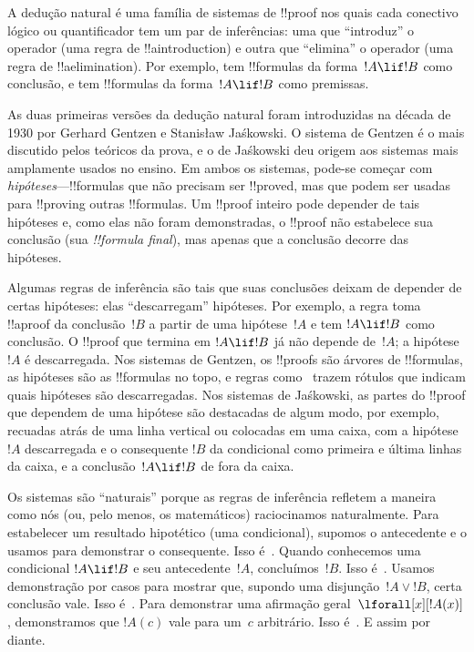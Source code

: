 \documentclass[../../../include/open-logic-section]{subfiles}
\begin{document}


A dedução natural é uma família de sistemas de !!{proof} nos quais cada
conectivo lógico ou quantificador tem um par de inferências: uma que
``introduz'' o operador (uma regra de !!a{introduction}) e outra que
``elimina'' o operador (uma regra de !!a{elimination}). Por exemplo,
\Intro{\lif} tem !!{formula}s da forma~$!A \lif !B$ como conclusão, e
\Elim{\lif} tem !!{formula}s da forma~$!A \lif !B$ como premissas.

As duas primeiras versões da dedução natural foram introduzidas na década
de 1930 por Gerhard Gentzen e Stanisław Jaśkowski. O sistema de Gentzen é o
mais discutido pelos teóricos da prova, e o de Jaśkowski deu origem aos
sistemas mais amplamente usados no ensino. Em ambos os sistemas, pode-se
começar com \emph{hipóteses}---!!{formula}s que não precisam ser
!!{prove}d, mas que podem ser usadas para !!{proving} outras !!{formula}s.
Um !!{proof} inteiro pode depender de tais hipóteses e, como elas não foram
demonstradas, o !!{proof} não estabelece sua conclusão (sua
\emph{!!{formula} final}), mas apenas que a conclusão decorre das
hipóteses.

Algumas regras de inferência são tais que suas conclusões deixam de depender
de certas hipóteses: elas ``descarregam'' hipóteses. Por exemplo, a regra
\Intro{\lif} toma !!a{proof} da conclusão~$!B$ a partir de uma hipótese~$!A$
e tem $!A \lif !B$ como conclusão. O !!{proof} que termina em $!A \lif !B$
já não depende de~$!A$; a hipótese $!A$ é descarregada. Nos sistemas de
Gentzen, os !!{proof}s são árvores de !!{formula}s, as hipóteses são as
!!{formula}s no topo, e regras como~\Intro{\lif} trazem rótulos que indicam
quais hipóteses são descarregadas. Nos sistemas de Jaśkowski, as partes do
!!{proof} que dependem de uma hipótese são destacadas de algum modo, por
exemplo, recuadas atrás de uma linha vertical ou colocadas em uma caixa, com
a hipótese~$!A$ descarregada e o consequente $!B$ da condicional como primeira
e última linhas da caixa, e a conclusão~$!A \lif !B$ de \Intro{\lif} fora da
caixa.

Os sistemas são ``naturais'' porque as regras de inferência refletem a
maneira como nós (ou, pelo menos, os matemáticos) raciocinamos naturalmente.
Para estabelecer um resultado hipotético (uma condicional), supomos o
antecedente e o usamos para demonstrar o consequente. Isso é~\Intro{\lif}.
Quando conhecemos uma condicional $!A \lif !B$ e seu antecedente~$!A$,
concluímos~$!B$. Isso é~\Elim{\lif}. Usamos demonstração por casos para
mostrar que, supondo uma disjunção~$!A \lor !B$, certa conclusão vale. Isso
é~\Elim{\lor}. Para demonstrar uma afirmação geral~$\lforall[x][!A(x)]$,
demonstramos que $!A(c)$ vale para um~$c$ arbitrário. Isso
é~\Intro{\lforall}. E assim por diante.
\end{document}
